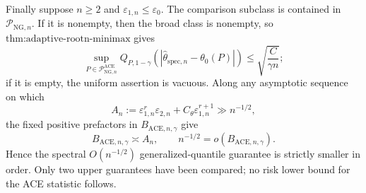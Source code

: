 Finally suppose \(n\ge2\) and \(\varepsilon_{1,n}\le\varepsilon_0\).  The comparison subclass is contained in \(\mathcal P_{\mathrm{NG},n}\).  If it is nonempty, then the broad class is nonempty, so
\(\text{thm:adaptive-rootn-minimax}\) gives
\[
 \sup_{P\in\mathcal P_{\mathrm{NG},n}^{\mathrm{ACE}}}
 Q_{P,1-\gamma}(|\widehat\theta_{\mathrm{spec},n}-\theta_0(P)|)
 \le\sqrt{\frac{C}{\gamma n}};
\]
if it is empty, the uniform assertion is vacuous.  Along any asymptotic sequence on which
\[
 A_n:=\varepsilon_{1,n}^r\varepsilon_{2,n}
      +C_{\theta}\varepsilon_{1,n}^{r+1}
 \gg n^{-1/2},
\]
the fixed positive prefactors in \(B_{\mathrm{ACE},n,\gamma}\) give
\[
 B_{\mathrm{ACE},n,\gamma}\asymp A_n,
 \qquad
 n^{-1/2}=o(B_{\mathrm{ACE},n,\gamma}).
\]
Hence the spectral \(O(n^{-1/2})\) generalized-quantile guarantee is strictly smaller in order.  Only two upper guarantees have been compared; no risk lower bound for the ACE statistic follows.